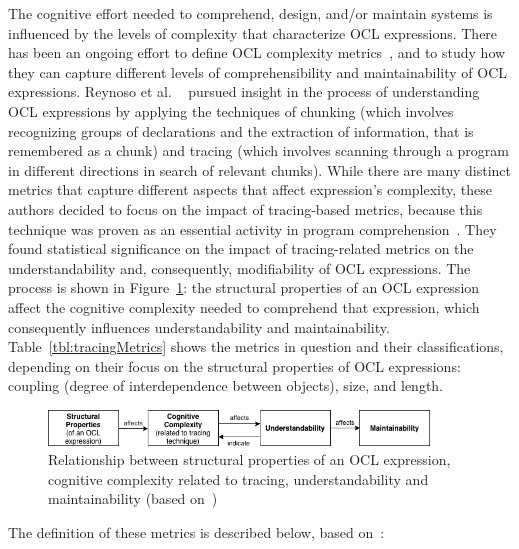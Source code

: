 The cognitive effort needed to comprehend, design, and/or maintain systems is influenced by the levels of complexity that characterize OCL expressions. There has been an ongoing effort to define OCL complexity metrics~\cite{Reynoso2005Book}, and to study how they can capture different levels of comprehensibility and maintainability of OCL expressions. Reynoso et al. ~\cite{Reynoso2005, Reynoso2010} pursued insight in the process of understanding OCL expressions by applying the techniques of chunking (which involves recognizing groups of declarations and the extraction of information, that is remembered as a chunk) and tracing (which involves scanning through a program in different directions in search of relevant chunks). While there are many distinct metrics that capture different aspects that affect expression's complexity, these authors decided to focus on the impact of tracing-based metrics, because this technique was proven as an essential activity in program comprehension~\cite{Reynoso2005Book}. They found statistical significance on the impact of tracing-related metrics on the understandability and, consequently, modifiability of OCL expressions. The process is shown in Figure~\ref{fig:03_oclcomplexity}: the structural properties of an OCL expression affect the cognitive complexity needed to comprehend that expression, which consequently influences understandability and maintainability. Table~\ref{tbl:tracingMetrics} shows the metrics in question and their classifications, depending on their focus on the structural properties of OCL expressions: coupling (degree of interdependence between objects), size, and length.

\begin{figure}[ht]
\centering
\includegraphics[width=0.9\textwidth]{Chapters/figures/4_RelatedWork/03_OCLComplexity.png}
\caption{Relationship between structural properties of an OCL expression, cognitive complexity related to tracing, understandability and maintainability (based on~\cite{Reynoso2005Book})}
\label{fig:03_oclcomplexity}
\end{figure}

%


The definition of these metrics is described below, based on~\cite{Reynoso2005Book}:

